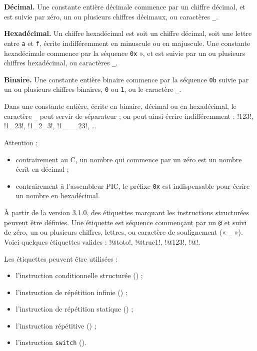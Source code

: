 \textbf{Décimal.} Une constante entière décimale commence par un chiffre décimal, et est suivie par zéro, un ou plusieurs chiffres décimaux, ou caractères \texttt{\_}.

\textbf{Hexadécimal.} Un chiffre hexadécimal est soit un chiffre décimal, soit une lettre entre \texttt{a} et \texttt{f}, écrite indifféremment en minuscule ou en majuscule. Une constante hexadécimale commence par la séquence \texttt{0x} », et est suivie par un ou plusieurs chiffres hexadécimal, ou caractères \texttt{\_}.

\textbf{Binaire.} Une constante entière binaire commence par la séquence \texttt{0b} suivie par un ou plusieurs chiffres binaires, \texttt{0} ou \texttt{1}, ou le caractère \texttt{\_}.

Dans une constante entière, écrite en binaire, décimal ou en hexadécimal, le caractère \texttt{\_} peut servir de séparateur ; on peut ainsi écrire indifféremment : \pic!123!, \pic!1_23!, \pic!1_2_3!, \pic!1___23!, \dots

Attention :
\begin{itemize}
  \item contrairement au C, un nombre qui commence par un zéro est un nombre écrit en décimal ;
  \item contrairement à l’assembleur PIC, le préfixe \texttt{0x} est indispensable pour écrire un nombre en hexadécimal.
\end{itemize}



À partir de la version 3.1.0, des étiquettes marquant les instructions structurées peuvent être définies. Une étiquette est séquence commençant par un \texttt{@} et suivi de zéro, un ou plusieurs chiffres, lettres, ou caractère de soulignement (« \texttt{\_} »). Voici quelques étiquettes valides : \pic!@toto!, \pic!@truc1!, \pic!@123!, \pic!@!.

Les étiquettes peuvent être utilisées :
\begin{itemize}
  \item l'instruction conditionnelle structurée () ;
  \item l'instruction de répétition infinie () ;
  \item l'instruction de répétition statique () ;
  \item l'instruction répétitive () ;
  \item l'instruction \texttt{switch} ().


\end{itemize}


